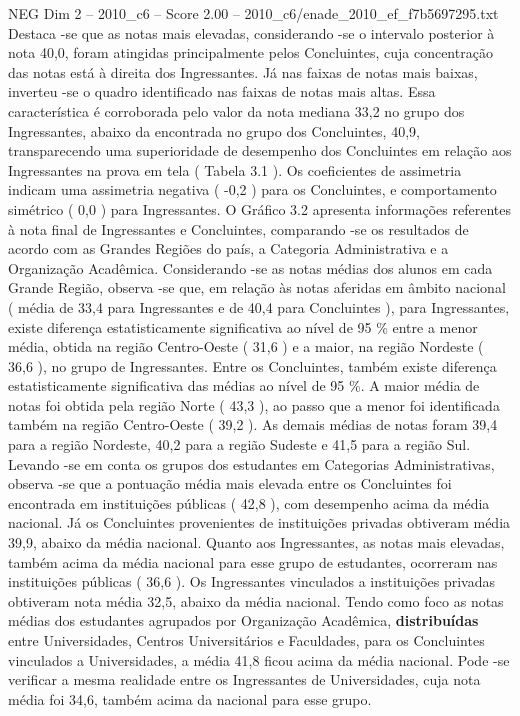 \begin{textsample}{NEG Dim 2 – 2010\_c6 – Score 2.00 – 2010\_c6/enade\_2010\_ef\_f7b5697295.txt}
Destaca -se que as notas mais elevadas, considerando -se o intervalo posterior à nota 40,0, foram atingidas principalmente pelos Concluintes, cuja concentração das notas está à direita dos Ingressantes.
Já nas faixas de notas mais baixas, inverteu -se o quadro identificado nas faixas de notas mais altas.
Essa característica é corroborada pelo valor da nota mediana 33,2 no grupo dos Ingressantes, abaixo da encontrada no grupo dos Concluintes, 40,9, transparecendo uma superioridade de desempenho dos Concluintes em relação aos Ingressantes na prova em tela ( Tabela 3.1 ).
Os coeficientes de assimetria indicam uma assimetria negativa ( -0,2 ) para os Concluintes, e comportamento simétrico ( 0,0 ) para Ingressantes.
O Gráfico 3.2 apresenta informações referentes à nota final de Ingressantes e Concluintes, comparando -se os resultados de acordo com as Grandes Regiões do país, a Categoria Administrativa e a Organização Acadêmica.
Considerando -se as notas médias dos alunos em cada Grande Região, observa -se que, em relação às notas aferidas em âmbito nacional ( média de 33,4 para Ingressantes e de 40,4 para Concluintes ), para Ingressantes, existe diferença estatisticamente significativa ao nível de 95 \% entre a menor média, obtida na região Centro-Oeste ( 31,6 ) e a maior, na região Nordeste ( 36,6 ), no grupo de Ingressantes.
Entre os Concluintes, também existe diferença estatisticamente significativa das médias ao nível de 95 \%.
A maior média de notas foi obtida pela região Norte ( 43,3 ), ao passo que a menor foi identificada também na região Centro-Oeste ( 39,2 ).
As demais médias de notas foram 39,4 para a região Nordeste, 40,2 para a região Sudeste e 41,5 para a região Sul.
Levando -se em conta os grupos dos estudantes em Categorias Administrativas, observa -se que a pontuação média mais elevada entre os Concluintes foi encontrada em instituições públicas ( 42,8 ), com desempenho acima da média nacional.
Já os Concluintes provenientes de instituições privadas obtiveram média 39,9, abaixo da média nacional.
Quanto aos Ingressantes, as notas mais elevadas, também acima da média nacional para esse grupo de estudantes, ocorreram nas instituições públicas ( 36,6 ).
Os Ingressantes vinculados a instituições privadas obtiveram nota média 32,5, abaixo da média nacional.
Tendo como foco as notas médias dos estudantes agrupados por Organização Acadêmica, \textbf{distribuídas} entre Universidades, Centros Universitários e Faculdades, para os Concluintes vinculados a Universidades, a média 41,8 ficou acima da média nacional.
Pode -se verificar a mesma realidade entre os Ingressantes de Universidades, cuja nota média foi 34,6, também acima da nacional para esse grupo.

\end{textsample}
